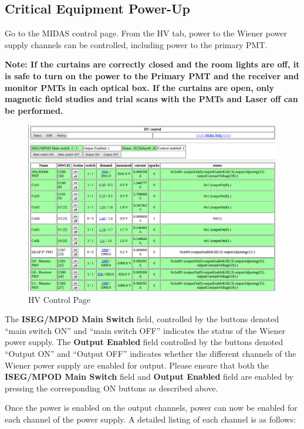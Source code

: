 \documentclass[twoside,letterpaper]{refart}
\begin{document}
\subsection{Critical Equipment Power-Up}\label{PowerUP}

Go to the MIDAS control page. From the HV tab, power to the Wiener power supply channels can be controlled, including power to the primary PMT.

\textbf{Note: If the curtains are correctly closed and the room lights are off, it is safe to turn on the power to the Primary PMT and the receiver and monitor PMTs in each optical box. If the curtains are open, only magnetic field studies and trial scans with the PMTs and Laser off can be performed.}

\FloatBarrier

\begin{figure}[!htpb]\centering	
	\includegraphics[width=\textwidth]{images/HVPage}
	\caption{HV Control Page\label{HVPage}}
\end{figure}

\FloatBarrier

The \textbf{ISEG/MPOD Main Switch} field, controlled by the buttons denoted ``main switch ON'' and ``main switch OFF'' indicates the status of the Wiener power supply. The \textbf{Output Enabled} field controlled by the buttons denoted ``Output ON'' and ``Output OFF'' indicates whether the different channels of the Wiener power supply are enabled for output. Please ensure that both the \textbf{ISEG/MPOD Main Switch} field and \textbf{Output Enabled} field are enabled by pressing the corresponding ON buttons as described above.

Once the power is enabled on the output channels, power can now be enabled for each channel of the power supply. A detailed listing of each channel is as follows:
\end{document}
